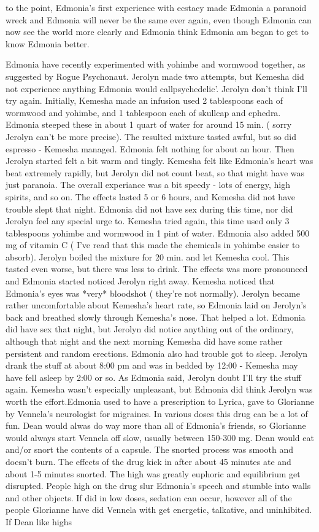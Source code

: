 \documentclass[12pt]{book}
\begin{document}
to the point, Edmonia's first experience with ecstacy made Edmonia a paranoid wreck and Edmonia will never be the same ever again, even though Edmonia can now see the world more clearly and Edmonia think Edmonia am began to get to know Edmonia better.



Edmonia have recently experimented with yohimbe and wormwood together, as suggested by Rogue Psychonaut. Jerolyn made two attempts, but Kemesha did not experience anything Edmonia would callpsychedelic'. Jerolyn don't think I'll try again. Initially, Kemesha made an infusion used 2 tablespoons each of wormwood and yohimbe, and 1 tablespoon each of skullcap and ephedra. Edmonia steeped these in about 1 quart of water for around 15 min. ( sorry Jerolyn can't be more precise). The resulted mixture tasted awful, but so did espresso - Kemesha managed. Edmonia felt nothing for about an hour. Then Jerolyn started felt a bit warm and tingly. Kemesha felt like Edmonia's heart was beat extremely rapidly, but Jerolyn did not count beat, so that might have was just paranoia. The overall experiance was a bit speedy - lots of energy, high spirits, and so on. The effects lasted 5 or 6 hours, and Kemesha did not have trouble slept that night. Edmonia did not have sex during this time, nor did Jerolyn feel any special urge to. Kemesha tried again, this time used only 3 tablespoons yohimbe and wormwood in 1 pint of water. Edmonia also added 500 mg of vitamin C ( I've read that this made the chemicals in yohimbe easier to absorb). Jerolyn boiled the mixture for 20 min. and let Kemesha cool. This tasted even worse, but there was less to drink. The effects was more pronounced and Edmonia started noticed Jerolyn right away. Kemesha noticed that Edmonia's eyes was *very* bloodshot ( they're not normally). Jerolyn became rather uncomfortable about Kemesha's heart rate, so Edmonia laid on Jerolyn's back and breathed slowly through Kemesha's nose. That helped a lot. Edmonia did have sex that night, but Jerolyn did notice anything out of the ordinary, although that night and the next morning Kemesha did have some rather persistent and random erections. Edmonia also had trouble got to sleep. Jerolyn drank the stuff at about 8:00 pm and was in bedded by 12:00 - Kemesha may have fell asleep by 2:00 or so. As Edmonia said, Jerolyn doubt I'll try the stuff again. Kemesha wasn't especially unpleasant, but Edmonia did think Jerolyn was worth the effort.Edmonia used to have a prescription to Lyrica, gave to Glorianne by Vennela's neurologist for migraines. In various doses this drug can be a lot of fun. Dean would alwas do way more than all of Edmonia's friends, so Glorianne would always start Vennela off slow, usually between 150-300 mg. Dean would eat and/or snort the contents of a capsule. The snorted process was smooth and doesn't burn. The effects of the drug kick in after about 45 minutes ate and about 1-5 minutes snorted. The high was greatly euphoric and equilibrium get disrupted. People high on the drug slur Edmonia's speech and stumble into walls and other objects. If did in low doses, sedation can occur, however all of the people Glorianne have did Vennela with get energetic, talkative, and uninhibited. If Dean like highs 
\end{document}

